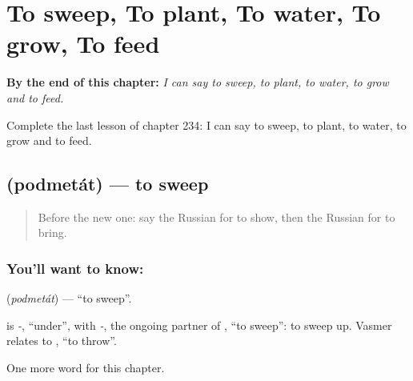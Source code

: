 
\chapter{To sweep, To plant, To water, To grow, To feed}
\label{ch:ru-to-sweep-to-plant-to-water-to-grow-to-feed}

\begin{chapteropening}
\textbf{By the end of this chapter:} \emph{I can say to sweep, to plant, to water, to grow and to feed.}

Complete the last lesson of chapter 234: I can say to sweep, to plant, to water, to grow and to feed.
\end{chapteropening}

\section[\texorpdfstring{\ru{подметать} (podmetát)}{подметать (podmetát)}]{ (podmetát) — to sweep}

\label{lesson:RU-C234-podmetat}



\begin{quote}
Before the new one: say the Russian for to show, then the Russian for to bring.
\end{quote}

\subsection*{You'll want to know: }
\textbf{} (\emph{podmetát}) — \textquotedblleft{}to sweep\textquotedblright{}.

\begin{cousinweb}
\textbf{} is \emph{-}, \textquotedblleft{}under\textquotedblright{}, with \emph{-}, the ongoing partner of \emph{}, \textquotedblleft{}to sweep\textquotedblright{}: to sweep up. Vasmer relates \emph{} to \emph{}, \textquotedblleft{}to throw\textquotedblright{}.
\end{cousinweb}

\begin{grammarlens}[title={What you've built}]
One more word for this chapter.
\end{grammarlens}

